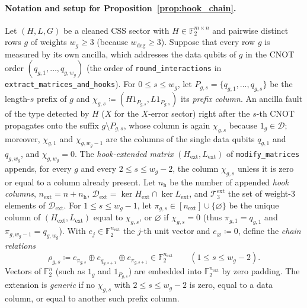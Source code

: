 \documentclass[12pt]{article}
\theoremstyle{definition}
\newcommand{\Ftwo}{\mathbb{F}_2}
\newcommand{\Dc}{\mathcal{D}}
\newcommand{\Tc}{\mathcal{T}_3}
\newcommand{\ttt}[1]{\texttt{#1}}
\begin{document}
\paragraph{Notation and setup for Proposition~\ref{prop:hook_chain}.}
Let $(H, L, G)$ be a cleaned CSS sector with $H \in \Ftwo^{m \times n}$ and pairwise distinct rows $g$ of weights
$w_g \ge 3$ (because $w_{\deg} \ge 3$). Suppose that every row $g$ is measured by its own ancilla, which addresses the
data qubits of $g$ in the CNOT order $(q_{g,1}, \dots, q_{g,w_g})$ (the order of \ttt{round\_interactions} in
\ttt{extract\_matrices\_and\_hooks}). For $0 \le s \le w_g$, let $P_{g,s} = \{q_{g,1}, \dots, q_{g,s}\}$ be the
length-$s$ prefix of $g$ and $\chi_{g,s} \coloneqq (H 1_{P_{g,s}}, L 1_{P_{g,s}})$ its \emph{prefix column}. An
ancilla fault of the type detected by $H$ ($X$ for the $X$-error sector) right after the $s$-th CNOT propagates onto
the suffix $g \setminus P_{g,s}$, whose column is again $\chi_{g,s}$ because $1_g \in \Dc$; moreover, $\chi_{g,1}$
and $\chi_{g,w_g-1}$ are the columns of the single data qubits $q_{g,1}$ and $q_{g,w_g}$, and $\chi_{g,w_g} = 0$. The
\emph{hook-extended matrix} $(H_{\mathrm{ext}}, L_{\mathrm{ext}})$ of \ttt{modify\_matrices} appends, for every $g$
and every $2 \le s \le w_g - 2$, the column $\chi_{g,s}$ unless it is zero or equal to a column already present. Let
$n_{\mathrm{h}}$ be the number of appended \emph{hook columns}, $n_{\mathrm{ext}} = n + n_{\mathrm{h}}$,
$\Dc_{\mathrm{ext}} = \ker H_{\mathrm{ext}} \cap \ker L_{\mathrm{ext}}$, and $\Tc^{\mathrm{ext}}$ the set of weight-3
elements of $\Dc_{\mathrm{ext}}$. For $1 \le s \le w_g - 1$, let $\pi_{g,s} \in [n_{\mathrm{ext}}] \cup
\{\varnothing\}$ be the unique column of $(H_{\mathrm{ext}}, L_{\mathrm{ext}})$ equal to $\chi_{g,s}$, or
$\varnothing$ if $\chi_{g,s} = 0$ (thus $\pi_{g,1} = q_{g,1}$ and $\pi_{g,w_g-1} = q_{g,w_g}$). With $e_j \in
\Ftwo^{n_{\mathrm{ext}}}$ the $j$-th unit vector and $e_\varnothing \coloneqq 0$, define the \emph{chain relations}
\begin{equation}\label{eq:chain_rel}
  \rho_{g,s} \coloneqq e_{\pi_{g,s}} \oplus e_{q_{g,s+1}} \oplus e_{\pi_{g,s+1}} \in \Ftwo^{n_{\mathrm{ext}}} \qquad
  (1 \le s \le w_g - 2).
\end{equation}
Vectors of $\Ftwo^n$ (such as $1_g$ and $1_{P_{g,s}}$) are embedded into $\Ftwo^{n_{\mathrm{ext}}}$ by zero padding.
The extension is \emph{generic} if no $\chi_{g,s}$ with $2 \le s \le w_g - 2$ is zero, equal to a data column, or
equal to another such prefix column.
\end{document}
